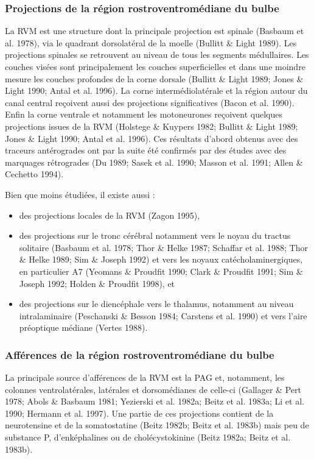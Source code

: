 \documentclass[a4paper,12pt,twoside]{report}
\begin{document}
\subsubsection{Projections de la région rostroventromédiane du bulbe}
\label{Projections de la RVM}

La RVM est une structure dont la principale projection est spinale (Basbaum et al. 1978), via le quadrant dorsolatéral de la moelle (Bullitt \& Light 1989). Les projections spinales se retrouvent au niveau de tous les segments médullaires. Les couches visées sont principalement les couches superficielles et dans une moindre mesure les couches profondes de la corne dorsale (Bullitt \& Light 1989; Jones \& Light 1990; Antal et al. 1996). La corne intermédiolatérale et la région autour du canal central reçoivent aussi des projections significatives (Bacon et al. 1990). Enfin la corne ventrale et notamment les motoneurones reçoivent quelques projections issues de la RVM (Holstege \& Kuypers 1982; Bullitt \& Light 1989; Jones \& Light 1990; Antal et al. 1996). Ces résultats d’abord obtenus avec des traceurs antérogrades ont par la suite été confirmés par des études avec des marquages rétrogrades (Du 1989; Sasek et al. 1990; Masson et al. 1991; Allen \& Cechetto 1994).

Bien que moins étudiées, il existe aussi :

\begin{itemize}
\item des projections locales de la RVM (Zagon 1995), 
\item des projections sur le tronc cérébral notamment vers le noyau du tractus solitaire (Basbaum et al. 1978; Thor \& Helke 1987; Schaffar et al. 1988; Thor \& Helke 1989; Sim \& Joseph 1992) et vers les noyaux catécholaminergiques, en particulier A7 (Yeomans \& Proudfit 1990; Clark \& Proudfit 1991; Sim \& Joseph 1992; Holden \& Proudfit 1998), et
\item des projections sur le diencéphale vers le thalamus, notamment au niveau intralaminaire (Peschanski \& Besson 1984; Carstens et al. 1990) et vers l’aire préoptique médiane (Vertes 1988).
\end{itemize}

\subsubsection{Afférences de la région rostroventromédiane du bulbe}

La principale source d’afférences de la RVM est la PAG et, notamment, les colonnes ventrolatérales, latérales et dorsomédianes de celle-ci (Gallager \& Pert 1978; Abols \& Basbaum 1981; Yezierski et al. 1982a; Beitz et al. 1983a; Li et al. 1990; Hermann et al. 1997). Une partie de ces projections contient de la neurotensine et de la somatostatine (Beitz 1982b; Beitz et al. 1983b) mais peu de substance P, d’enképhalines ou de cholécystokinine (Beitz 1982a; Beitz et al. 1983b). 
\end{document}
